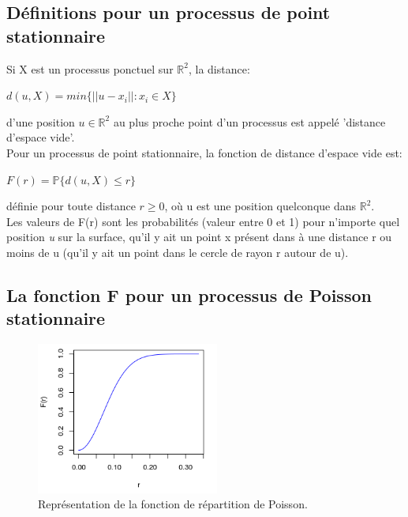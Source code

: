 \documentclass[stage2a]{tnreport}
\begin{document}
\subsection{Définitions pour un processus de point stationnaire}
Si X est un processus ponctuel sur \begin{math} \mathbb{R}^2 \end{math}, la distance:
\begin{center}\begin{math} d(u,X) = min\{ ||u-x_i|| : x_i \in X \} \end{math}\end{center}
d'une position \begin{math} u \in \mathbb{R}^2 \end{math} au plus proche point d'un processus est appelé 'distance d'espace vide'.\\
Pour un processus de point stationnaire, la fonction de distance d'espace vide est:
\begin{center}\begin{math} F(r) = \mathbb{P}\{ d(u,X) \leq r \} \end{math}\end{center}
définie pour toute distance \begin{math} r \geq 0 \end{math}, où u est une position quelconque dans \begin{math} \mathbb{R}^2 \end{math}.\\

Les valeurs de F(r) sont les probabilités (valeur entre 0 et 1) pour n'importe quel position \textit{u} sur la surface, qu'il y ait un point x présent dans à une distance r ou moins de u (qu'il y ait un point dans le cercle de rayon r autour de u).\\


\subsection{La fonction F pour un processus de Poisson stationnaire}

\begin{figure}
\vspace{-0.8cm}
\begin{center}
\includegraphics[width=6cm]{figures/poisson2.png}
\caption{Représentation de la fonction de répartition de Poisson.}
\label{fig:poisson}
\end{center}
\end{figure}
\end{document}
